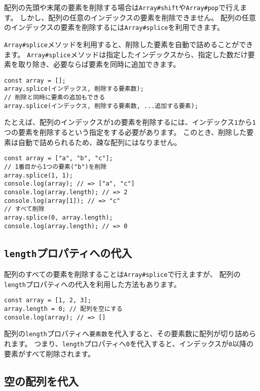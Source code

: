 配列の先頭や末尾の要素を削除する場合は\texttt{Array\#shift}や\texttt{Array\#pop}で行えます。
しかし、配列の任意のインデックスの要素を削除できません。
配列の任意のインデックスの要素を削除するには\texttt{Array\#splice}を利用できます。

\texttt{Array\#splice}メソッドを利用すると、削除した要素を自動で詰めることができます。
\texttt{Array\#splice}メソッドは指定したインデックスから、指定した数だけ要素を取り除き、必要ならば要素を同時に追加できます。

\begin{lstlisting}
const array = [];
array.splice(インデックス, 削除する要素数);
// 削除と同時に要素の追加もできる
array.splice(インデックス, 削除する要素数, ...追加する要素);
\end{lstlisting}

たとえば、配列のインデックスが\texttt{1}の要素を削除するには、インデックス\texttt{1}から\texttt{1}つの要素を削除するという指定をする必要があります。
このとき、削除した要素は自動で詰められるため、疎な配列にはなりません。

\begin{lstlisting}
const array = ["a", "b", "c"];
// 1番目から1つの要素("b")を削除
array.splice(1, 1);
console.log(array); // => ["a", "c"]
console.log(array.length); // => 2
console.log(array[1]); // => "c"
// すべて削除
array.splice(0, array.length);
console.log(array.length); // => 0
\end{lstlisting}

\hypertarget{assign-to-length}{%
\subsection{\texorpdfstring{\texttt{length}プロパティへの代入}{lengthプロパティへの代入}}\label{assign-to-length}}

配列のすべての要素を削除することは\texttt{Array\#splice}で行えますが、
配列の\texttt{length}プロパティへの代入を利用した方法もあります。

\begin{lstlisting}
const array = [1, 2, 3];
array.length = 0; // 配列を空にする
console.log(array); // => []
\end{lstlisting}

配列の\texttt{length}プロパティへ\texttt{要素数}を代入すると、その要素数に配列が切り詰められます。
つまり、\texttt{length}プロパティへ\texttt{0}を代入すると、インデックスが\texttt{0}以降の要素がすべて削除されます。

\hypertarget{assign-empty-array}{%
\subsection{空の配列を代入}\label{assign-empty-array}}

